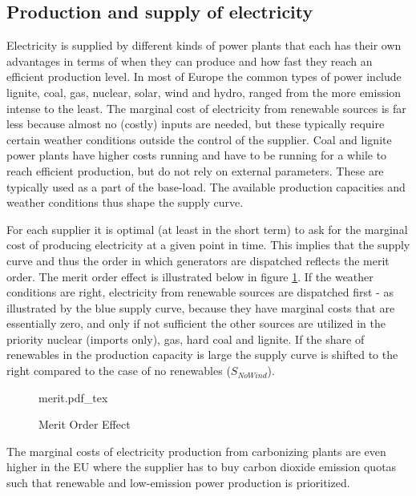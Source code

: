 \subsection{Production and supply of electricity}
\label{subsec:t_production}
Electricity is supplied by different kinds of power plants that each has their own advantages in terms of when they can produce and how fast they reach an efficient production level. In most of Europe the common types of power include lignite, coal, gas, nuclear, solar, wind and hydro, ranged from the more emission intense to the least. The marginal cost of electricity from renewable sources is far less because almost no (costly) inputs are needed, but these typically require certain weather conditions outside the control of the supplier. Coal and lignite power plants have higher costs running and have to be running for a while to reach efficient production, but do not rely on external parameters. These are typically used as a part of the base-load. The available production capacities and weather conditions thus shape the supply curve.
\bigskip \par
For each supplier it is optimal (at least in the short term) to ask for the marginal cost of producing electricity at a given point in time. This implies that the supply curve and thus the order in which generators are dispatched reflects the merit order. The merit order effect is illustrated below in figure \ref{fig:merit}. If the weather conditions are right, electricity from renewable sources are dispatched first - as illustrated by the blue supply curve, because they have marginal costs that are essentially zero, and only if not sufficient the other sources are utilized in the priority nuclear (imports only), gas, hard coal and lignite. If the share of renewables in the production capacity is large the supply curve is shifted to the right compared to the case of no renewables ($S_{NoWind}$).
\begin{figure}[H]
    \centering
    \caption{Merit Order Effect}
    \label{fig:merit}
    \center
        \def\svgwidth{0.9\textwidth}
        {merit.pdf_tex}
\end{figure}
The marginal costs of electricity production from carbonizing plants are even higher in the EU where the supplier has to buy carbon dioxide emission quotas such that renewable and low-emission power production is prioritized. %
\bigskip \par

